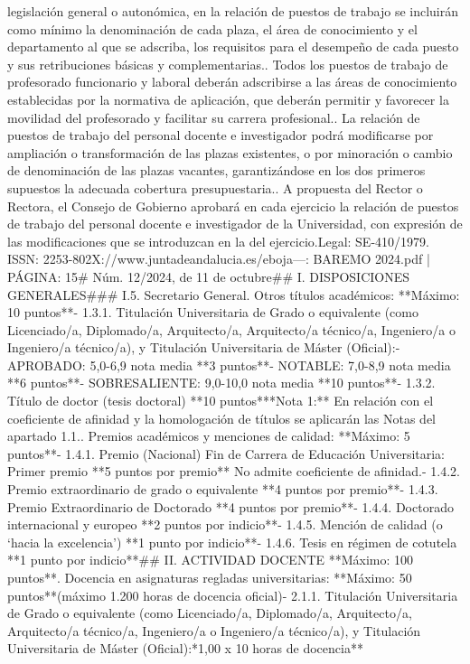 \documentclass{article}
\begin{document}
\begin{itemize}
{{legislación general o autonómica, en la relación de puestos de trabajo se incluirán como mínimo la denominación de cada plaza, el área de conocimiento y el departamento al que se adscriba, los requisitos para el desempeño de cada puesto y sus retribuciones básicas y complementarias.. Todos los puestos de trabajo de profesorado funcionario y laboral deberán adscribirse a las áreas de conocimiento establecidas por la normativa de aplicación, que deberán permitir y favorecer la movilidad del profesorado y facilitar su carrera profesional.. La relación de puestos de trabajo del personal docente e investigador podrá modificarse por ampliación o transformación de las plazas existentes, o por minoración o cambio de denominación de las plazas vacantes, garantizándose en los dos primeros supuestos la adecuada cobertura presupuestaria.. A propuesta del Rector o Rectora, el Consejo de Gobierno aprobará en cada ejercicio la relación de puestos de trabajo del personal docente e investigador de la Universidad, con expresión de las modificaciones que se introduzcan en la del ejercicio.\n{} Legal: SE-410/1979. ISSN: 2253-802X\nhttps://www.juntadeandalucia.es/eboja\n\n---\n\nFUENTE: BAREMO 2024.pdf | PÁGINA: 15\n# Núm. 12/2024, de 11 de octubre\n\n## I. DISPOSICIONES GENERALES\n\n### I.5. Secretario General\n{}. Otros títulos académicos:                                                            **Máximo: 10 puntos**\n- 1.3.1. Titulación Universitaria de Grado o equivalente (como Licenciado/a, Diplomado/a, Arquitecto/a, Arquitecto/a técnico/a, Ingeniero/a o Ingeniero/a técnico/a), y Titulación Universitaria de Máster (Oficial):\n- APROBADO: 5,0-6,9 nota media                            **3 puntos**\n- NOTABLE: 7,0-8,9 nota media                             **6 puntos**\n- SOBRESALIENTE: 9,0-10,0 nota media                      **10 puntos**\n- 1.3.2. Título de doctor (tesis doctoral)                  **10 puntos**\n\n**Nota 1:** En relación con el coeficiente de afinidad y la homologación de títulos se aplicarán las Notas del apartado 1.1.\n{}. Premios académicos y menciones de calidad:                                           **Máximo: 5 puntos**\n- 1.4.1. Premio (Nacional) Fin de Carrera de Educación Universitaria: Primer premio           **5 puntos por premio**           No admite coeficiente de afinidad.\n- 1.4.2. Premio extraordinario de grado o equivalente        **4 puntos por premio**\n- 1.4.3. Premio Extraordinario de Doctorado                  **4 puntos por premio**\n- 1.4.4. Doctorado internacional y europeo                   **2 puntos por indicio**\n- 1.4.5. Mención de calidad (o ‘hacia la excelencia’)        **1 punto por indicio**\n- 1.4.6. Tesis en régimen de cotutela                        **1 punto por indicio**\n\n## II. ACTIVIDAD DOCENTE                                                                     **Máximo: 100 puntos**\n{}. Docencia en asignaturas regladas universitarias:                                     **Máximo: 50 puntos**\n(máximo 1.200 horas de docencia oficial)\n- 2.1.1. Titulación Universitaria de Grado o equivalente (como Licenciado/a, Diplomado/a, Arquitecto/a, Arquitecto/a técnico/a, Ingeniero/a o Ingeniero/a técnico/a), y Titulación Universitaria de Máster (Oficial):\n**1,00 x 10 horas de docencia**\nEn }}
\end{itemize}
\end{document}
